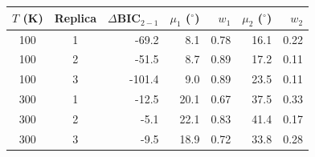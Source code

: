 \begin{tabular}{ccrrrrr}
\toprule
$T$ (K) & Replica & $\Delta$BIC$_{2-1}$ & $\mu_1$ ($^\circ$) & $w_1$ & $\mu_2$ ($^\circ$) & $w_2$\\
\midrule
100 & 1 & -69.2 & 8.1 & 0.78 & 16.1 & 0.22\\
100 & 2 & -51.5 & 8.7 & 0.89 & 17.2 & 0.11\\
100 & 3 & -101.4 & 9.0 & 0.89 & 23.5 & 0.11\\
300 & 1 & -12.5 & 20.1 & 0.67 & 37.5 & 0.33\\
300 & 2 & -5.1 & 22.1 & 0.83 & 41.4 & 0.17\\
300 & 3 & -9.5 & 18.9 & 0.72 & 33.8 & 0.28\\
\bottomrule
\end{tabular}
